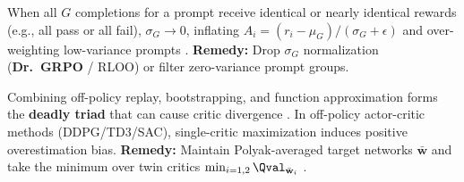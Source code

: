 \documentclass[../../../../master.tex]{subfiles}
\begin{document}
\begin{pitfall}
When all $G$ completions for a prompt receive identical or nearly identical rewards (e.g., all pass or all fail), $\sigma_G \to 0$, inflating $A_i = (r_i - \mu_G)/(\sigma_G + \epsilon)$ and over-weighting low-variance prompts . \textbf{Remedy:} Drop $\sigma_G$ normalization (\textbf{Dr.\ GRPO} / RLOO) or filter zero-variance prompt groups.
\end{pitfall}

\begin{pitfall}
Combining off-policy replay, bootstrapping, and function approximation forms the \textbf{deadly triad} that can cause critic divergence . In off-policy actor-critic methods (DDPG/TD3/SAC), single-critic maximization induces positive overestimation bias. \textbf{Remedy:} Maintain Polyak-averaged target networks $\bar{\mathbf{w}}$ and take the minimum over twin critics $\min_{i=1,2}\Qval_{\bar{\mathbf{w}}_i}$ .
\end{pitfall}

\endgroup
\end{document}
